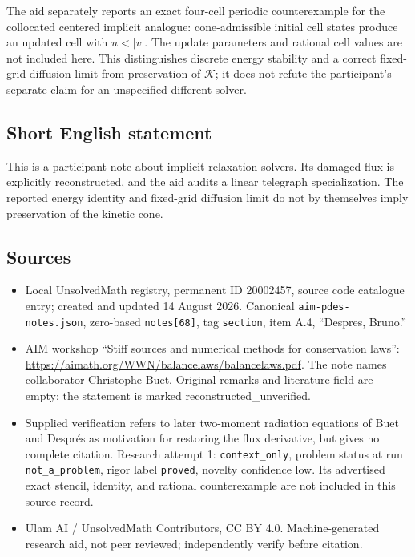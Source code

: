 \documentclass[11pt]{article}
\begin{document}
The aid separately reports an exact four-cell periodic counterexample for the collocated centered implicit analogue: cone-admissible initial cell states produce an updated cell with $u<|v|$. The update parameters and rational cell values are not included here. This distinguishes discrete energy stability and a correct fixed-grid diffusion limit from preservation of $\mathcal K$; it does not refute the participant's separate claim for an unspecified different solver.
\subsection{Short English statement}
This is a participant note about implicit relaxation solvers. Its damaged flux is explicitly reconstructed, and the aid audits a linear telegraph specialization. The reported energy identity and fixed-grid diffusion limit do not by themselves imply preservation of the kinetic cone.
\subsection{Sources}
\begin{itemize}
\item Local UnsolvedMath registry, permanent ID 20002457, source code catalogue entry; created and updated 14 August 2026. Canonical \texttt{aim-pdes-notes.json}, zero-based \texttt{notes[68]}, tag \texttt{section}, item A.4, ``Despres, Bruno.''
\item AIM workshop ``Stiff sources and numerical methods for conservation laws'': \url{https://aimath.org/WWN/balancelaws/balancelaws.pdf}. The note names collaborator Christophe Buet. Original remarks and literature field are empty; the statement is marked reconstructed\_unverified.
\item Supplied verification refers to later two-moment radiation equations of Buet and Despr\'es as motivation for restoring the flux derivative, but gives no complete citation. Research attempt 1: \texttt{context\_only}, problem status at run \texttt{not\_a\_problem}, rigor label \texttt{proved}, novelty confidence low. Its advertised exact stencil, identity, and rational counterexample are not included in this source record.
\item Ulam AI / UnsolvedMath Contributors, CC BY 4.0. Machine-generated research aid, not peer reviewed; independently verify before citation.
\end{itemize}
\end{document}
